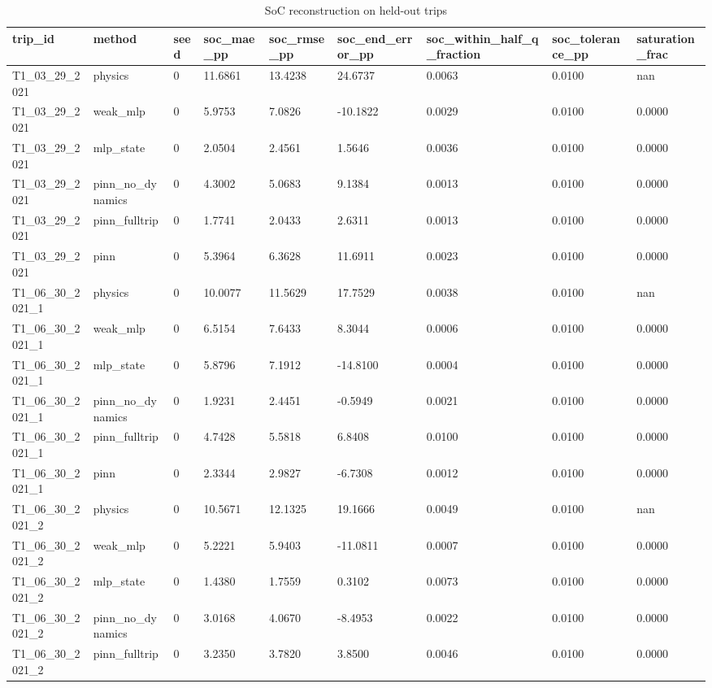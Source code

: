 \begin{table}[t]
\centering
\caption{SoC reconstruction on held-out trips}
\label{tab:soc}
\begin{tabular}{lllllllll}
\hline
trip\_id & method & seed & soc\_mae\_pp & soc\_rmse\_pp & soc\_end\_error\_pp & soc\_within\_half\_q\_fraction & soc\_tolerance\_pp & saturation\_frac \\
\hline
T1\_03\_29\_2021 & physics & 0 & 11.6861 & 13.4238 & 24.6737 & 0.0063 & 0.0100 & nan \\
T1\_03\_29\_2021 & weak\_mlp & 0 & 5.9753 & 7.0826 & -10.1822 & 0.0029 & 0.0100 & 0.0000 \\
T1\_03\_29\_2021 & mlp\_state & 0 & 2.0504 & 2.4561 & 1.5646 & 0.0036 & 0.0100 & 0.0000 \\
T1\_03\_29\_2021 & pinn\_no\_dynamics & 0 & 4.3002 & 5.0683 & 9.1384 & 0.0013 & 0.0100 & 0.0000 \\
T1\_03\_29\_2021 & pinn\_fulltrip & 0 & 1.7741 & 2.0433 & 2.6311 & 0.0013 & 0.0100 & 0.0000 \\
T1\_03\_29\_2021 & pinn & 0 & 5.3964 & 6.3628 & 11.6911 & 0.0023 & 0.0100 & 0.0000 \\
T1\_06\_30\_2021\_1 & physics & 0 & 10.0077 & 11.5629 & 17.7529 & 0.0038 & 0.0100 & nan \\
T1\_06\_30\_2021\_1 & weak\_mlp & 0 & 6.5154 & 7.6433 & 8.3044 & 0.0006 & 0.0100 & 0.0000 \\
T1\_06\_30\_2021\_1 & mlp\_state & 0 & 5.8796 & 7.1912 & -14.8100 & 0.0004 & 0.0100 & 0.0000 \\
T1\_06\_30\_2021\_1 & pinn\_no\_dynamics & 0 & 1.9231 & 2.4451 & -0.5949 & 0.0021 & 0.0100 & 0.0000 \\
T1\_06\_30\_2021\_1 & pinn\_fulltrip & 0 & 4.7428 & 5.5818 & 6.8408 & 0.0100 & 0.0100 & 0.0000 \\
T1\_06\_30\_2021\_1 & pinn & 0 & 2.3344 & 2.9827 & -6.7308 & 0.0012 & 0.0100 & 0.0000 \\
T1\_06\_30\_2021\_2 & physics & 0 & 10.5671 & 12.1325 & 19.1666 & 0.0049 & 0.0100 & nan \\
T1\_06\_30\_2021\_2 & weak\_mlp & 0 & 5.2221 & 5.9403 & -11.0811 & 0.0007 & 0.0100 & 0.0000 \\
T1\_06\_30\_2021\_2 & mlp\_state & 0 & 1.4380 & 1.7559 & 0.3102 & 0.0073 & 0.0100 & 0.0000 \\
T1\_06\_30\_2021\_2 & pinn\_no\_dynamics & 0 & 3.0168 & 4.0670 & -8.4953 & 0.0022 & 0.0100 & 0.0000 \\
T1\_06\_30\_2021\_2 & pinn\_fulltrip & 0 & 3.2350 & 3.7820 & 3.8500 & 0.0046 & 0.0100 & 0.0000 \\

\end{tabular}
\end{table}
